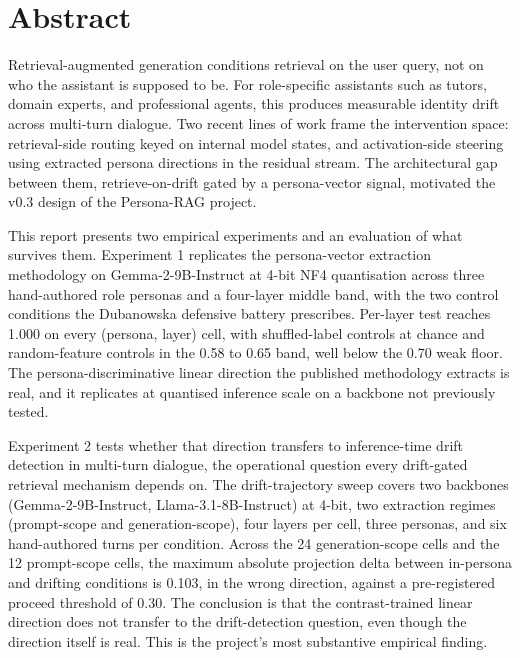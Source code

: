 \chapter*{Abstract}

Retrieval-augmented generation conditions retrieval on the user query, not on who the assistant is supposed to be. For role-specific assistants such as tutors, domain experts, and professional agents, this produces measurable identity drift across multi-turn dialogue. Two recent lines of work frame the intervention space: retrieval-side routing keyed on internal model states, and activation-side steering using extracted persona directions in the residual stream. The architectural gap between them, retrieve-on-drift gated by a persona-vector signal, motivated the v0.3 design of the Persona-RAG project.

This report presents two empirical experiments and an evaluation of what survives them. Experiment 1 replicates the persona-vector extraction methodology on Gemma-2-9B-Instruct at 4-bit NF4 quantisation across three hand-authored role personas and a four-layer middle band, with the two control conditions the Dubanowska defensive battery prescribes. Per-layer test \auroc{} reaches 1.000 on every (persona, layer) cell, with shuffled-label controls at chance and random-feature controls in the 0.58 to 0.65 band, well below the 0.70 weak floor. The persona-discriminative linear direction the published methodology extracts is real, and it replicates at quantised inference scale on a backbone not previously tested.

Experiment 2 tests whether that direction transfers to inference-time drift detection in multi-turn dialogue, the operational question every drift-gated retrieval mechanism depends on. The drift-trajectory sweep covers two backbones (Gemma-2-9B-Instruct, Llama-3.1-8B-Instruct) at 4-bit, two extraction regimes (prompt-scope and generation-scope), four layers per cell, three personas, and six hand-authored turns per condition. Across the 24 generation-scope cells and the 12 prompt-scope cells, the maximum absolute projection delta between in-persona and drifting conditions is 0.103, in the wrong direction, against a pre-registered proceed threshold of 0.30. The conclusion is that the contrast-trained linear direction does not transfer to the drift-detection question, even though the direction itself is real. This is the project's most substantive empirical finding.

